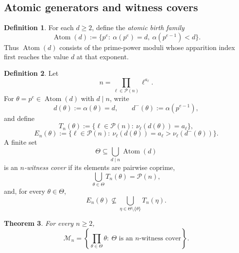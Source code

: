 \documentclass[11pt,letterpaper]{article}
\numberwithin{equation}{section}
\theoremstyle{plain}
\newtheorem{theorem}{Theorem}[section]
\theoremstyle{definition}
\newtheorem{definition}[theorem]{Definition}
\theoremstyle{remark}
\DeclareMathOperator{\Atom}{Atom}
\begin{document}
\subsection*{Atomic generators and witness covers}

\begin{definition}
\label{def:atomic-birth-families}
For each $d\ge 2$, define the \emph{atomic birth family}
\[
\Atom(d):=\{p^e:\ \alpha(p^e)=d,\ \alpha(p^{e-1})<d\}.
\]
Thus $\Atom(d)$ consists of the prime-power moduli whose apparition index
first reaches the value $d$ at that exponent.
\end{definition}

\begin{definition}
\label{def:witness-cover}
Let
\[
n=\prod_{\ell\in\mathcal P(n)}\ell^{a_\ell}.
\]
For $\theta=p^e\in \Atom(d)$ with $d\mid n$, write
\[
d(\theta):=\alpha(\theta)=d,
\qquad
d^{-}(\theta):=\alpha(p^{e-1}),
\]
and define
\[
T_n(\theta):=\{\ell\in\mathcal P(n):\ \nu_\ell(d(\theta))=a_\ell\},
\]
\[
E_n(\theta):=\{\ell\in\mathcal P(n):\ \nu_\ell(d(\theta))=a_\ell>
\nu_\ell(d^{-}(\theta))\}.
\]
A finite set
\[
\Theta\subseteq \bigcup_{d\mid n}\Atom(d)
\]
is an \emph{$n$-witness cover} if its elements are pairwise coprime,
\[
\bigcup_{\theta\in\Theta}T_n(\theta)=\mathcal P(n),
\]
and, for every $\theta\in\Theta$,
\[
E_n(\theta)\nsubseteq
\bigcup_{\eta\in\Theta\setminus\{\theta\}}T_n(\eta).
\]
\end{definition}

\begin{theorem}
\label{thm:atomic-witness-classification}
For every $n\ge 2$,
\[
\mathcal M_n=
\left\{
\prod_{\theta\in\Theta}\theta:\ \Theta\text{ is an $n$-witness cover}
\right\}.
\]
\end{theorem}
\end{document}
